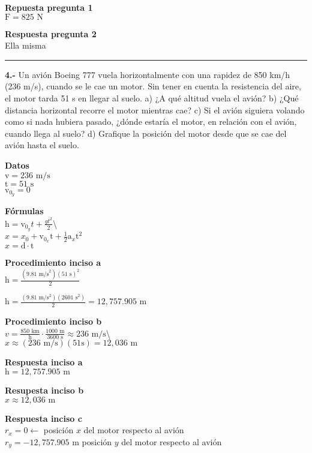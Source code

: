\documentclass[
]{article}
\begin{document}
\textbf{Repuesta pregunta 1}\\
{\(\text{F} = 825\text{~N}\)}

\textbf{Respuesta pregunta 2}\\
Ella misma

\begin{center}\rule{0.5\linewidth}{0.5pt}\end{center}

\textbf{4.-} Un avión Boeing 777 vuela horizontalmente con una rapidez
de 850 km/h (236 m/s), cuando se le cae un motor. Sin tener en cuenta la
resistencia del aire, el motor tarda 51 s en llegar al suelo. a) ¿A qué
altitud vuela el avión? b) ¿Qué distancia horizontal recorre el motor
mientras cae? c) Si el avión siguiera volando como si nada hubiera
pasado, ¿dónde estaría el motor, en relación con el avión, cuando llega
al suelo? d) Grafique la posición del motor desde que se cae del avión
hasta el suelo.

\textbf{Datos}\\
{\(\text{v} = 236\text{~m/s}\)}\\
{\(\text{t} = 51\text{~s}\)}\\
{\(\text{v}_{0_{y}} = 0\)}

\textbf{Fórmulas}\\
{\(\text{h} = \text{v}_{0_{y}}t + \frac{gt^{2}}{2}\)}\textbackslash{}\\
{\(x = x_{0} + \text{v}_{0_{x}}\text{t} + \frac{1}{2}\text{a}_{x}\text{t}^{2}\)}\\
{\(x = \text{d} \cdot \text{t}\)}

\textbf{Procedimiento inciso a}\\
{\(\text{h} = \frac{(9.81\text{~m/s}^{2})(51\text{~s})^{2}}{2}\)}

{\(\text{h} = \frac{(9.81\text{~m}/\text{s}^{2})(2601\text{~s}^{2})}{2} = 12,757.905\text{~m}\)}

\textbf{Procedimiento inciso b}\\
{\(v = \frac{850\text{~km}}{\text{h}} \cdot \frac{1000\text{~m}}{3600\text{~s}} \approx 236\text{~m/s}\)}\textbackslash{}\\
{\(x \approx (236\text{~m/s})(51\text{s}) = 12,036\text{~m}\)}

\textbf{Respuesta inciso a}\\
{\(\text{h} = 12,757.905\text{~m}\)}

\textbf{Resupesta inciso b}\\
{\(x \approx 12,036\text{~m}\)}

\textbf{Respuesta inciso c}\\
{\(r_{x} = 0\leftarrow\)} posición {\(x\)} del motor respecto al avión\\
{\(r_{y} = - 12,757.905\text{~m}\)} posición {\(y\)} del motor respecto
al avión
\end{document}
